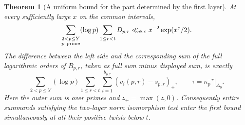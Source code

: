 \documentclass[a4paper,11pt]{article}
\newtheorem{theorem}[proposition]{Theorem}
\theoremstyle{definition}
\theoremstyle{remark}
\numberwithin{equation}{section}
\begin{document}
\begin{theorem}[A uniform bound for the part determined by the first layer]\leavevmode
\label{thm:normsum327}
At every sufficiently large \(x\) on the common intervals,
\[
 \sum_{\substack{2<p\le Y\\p\ {\rm prime}}}
  (\log p)\sum_{1\le r<t} D_{p,r}
  \ll_{\psi,\varepsilon} x^{-2}\exp(x^\varepsilon/2).
\]
The difference between the left side and the corresponding
sum of the full logarithmic orders of \(B_{p,r}\), taken as
full sum minus displayed sum, is exactly
\[
 \sum_{2<p\le Y}(\log p)\sum_{1\le r<t}
       \sum_{i=1}^{b_{p,\tau}}(v_i(p,r)-s_{p,r})_+ ,
       \qquad \tau=\kappa_p^{-r}|_{\Delta_0}.
\]
Here the outer sum is over primes and \(z_+=\max(z,0)\).
Consequently entire summands satisfying the two-layer
norm isomorphism test enter the first bound simultaneously
at all their positive twists below \(t\).
\end{theorem}
\end{document}
